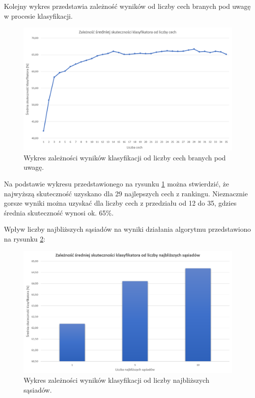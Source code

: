 \documentclass{article}
\begin{document}
\newpage

Kolejny wykres przedstawia zależność wyników od liczby cech branych pod uwagę w procesie klasyfikacji.

\begin{figure}[h]
    \centering
    \noindent 
    \vspace{.2cm}
    \includegraphics[width=16cm]{Cechy.png}
    \caption{Wykres zależności wyników klasyfikacji od liczby cech branych pod uwagę.}
    \label{fig:cechy}
\end{figure}

\noindent
Na podstawie wykresu przedstawionego na rysunku \ref{fig:cechy} można stwierdzić, że najwyższą skuteczność uzyskano dla 29 najlepszych cech z rankingu. Nieznacznie gorsze wyniki można uzyskać dla liczby cech z przedziału od 12 do 35, gdzies średnia skuteczność wynosi ok. 65\%. 

\newpage

Wpływ liczby najbliższych sąsiadów na wyniki działania algorytmu przedstawiono na rysunku \ref{fig:sasiedzi}:

\begin{figure}[h]
    \centering
    \noindent 
    \vspace{.2cm}
    \includegraphics[width=16cm]{sasiedzi.png}
    \caption{Wykres zależności wyników klasyfikacji od liczby najbliższych sąsiadów.}
    \label{fig:sasiedzi}
\end{figure}
\end{document}

